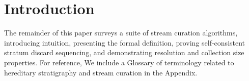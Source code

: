 \section{Introduction} \label{sec:introduction}


% 


\sectionbreak

The remainder of this paper surveys a suite of stream curation algorithms, introducing intuition, presenting the formal definition, proving self-consistent stratum discard sequencing, and demonstrating resolution and collection size properties.
For reference, We include a Glossary of terminology related to hereditary stratigraphy and stream curation in the Appendix.
